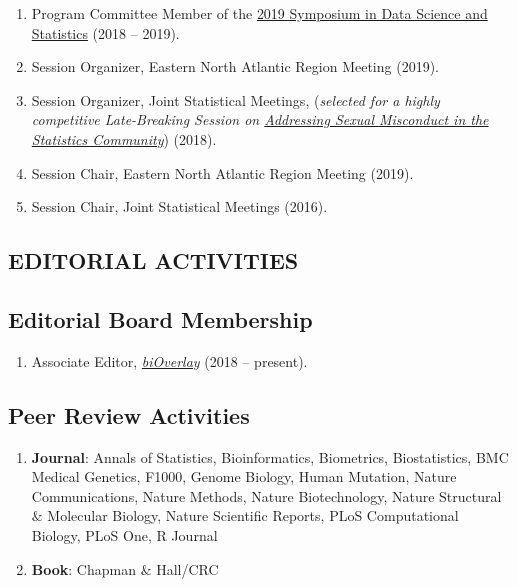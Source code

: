 \documentclass[10pt]{article}
\newcommand{\mydot}[1]{\begin{enumerate}[label=$\circ$,leftmargin=\parindent]\setlength{\itemsep}{#1}}
\newcommand{\ee}{\end{enumerate}}
\begin{document}
\mydot{-0.1em}
\item Program Committee Member of the \href{http://ww2.amstat.org/meetings/sdss/2019/}{2019 Symposium in Data Science and Statistics} (2018 -- 2019).
\item Session Organizer, Eastern North Atlantic Region Meeting (2019).
\item Session Organizer, Joint Statistical Meetings, (\textit{selected for a highly competitive Late-Breaking Session on \href{https://ww2.amstat.org/meetings/jsm/2018/onlineprogram/AbstractDetails.cfm?abstractid=329833}{Addressing Sexual Misconduct in the Statistics Community}}) (2018).
\item Session Chair, Eastern North Atlantic Region Meeting (2019).
\item Session Chair, Joint Statistical Meetings (2016).

\ee

\subsection*{EDITORIAL ACTIVITIES}

\smallskip

\subsection*{Editorial Board Membership} 

\mydot{-0.1em}

\item Associate Editor, \href{https://www.bioverlay.org}{\textit{biOverlay}} (2018 -- present).

\ee

\subsection*{Peer Review Activities} 

\mydot{-0.1em}

\item \textbf{Journal}: Annals of Statistics, Bioinformatics, Biometrics, 
Biostatistics, BMC Medical Genetics, F1000, Genome Biology, Human Mutation, 
Nature Communications, Nature Methods, Nature Biotechnology,
 Nature Structural $\&$ Molecular Biology, Nature Scientific Reports, 
 PLoS Computational Biology, PLoS One, R Journal

\item \textbf{Book}: Chapman $\&$ Hall/CRC

\ee
\end{document}
